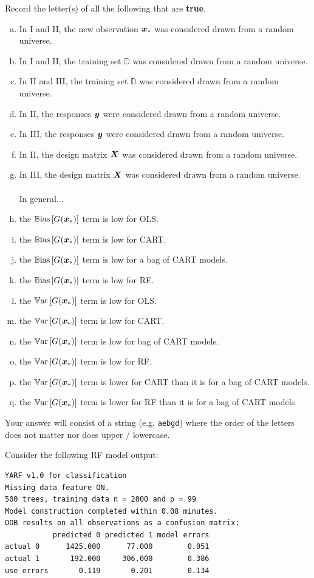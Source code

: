 \documentclass[12pt]{article}
\newcommand{\instr}{\small Your answer will consist of a string (e.g. \texttt{aebgd}) where the order of the letters does not matter nor does upper / lowercase. \normalsize}
\begin{document}
\benum
{} Record the letter(s) of all the following that are \textbf{true}. 

\begin{enumerate}[(a)]
\item In I and II, the new observation $\boldsymbol{x}_*$ was considered drawn from a random universe.
\item In I and II, the training set $\mathbb{D}$ was considered drawn from a random universe.
\item In II and III, the training set $\mathbb{D}$ was considered drawn from a random universe.
\item In II, the responses $\boldsymbol{y}$ were considered drawn from a random universe.
\item In III, the responses $\boldsymbol{y}$ were considered drawn from a random universe.
\item In II, the design matrix $\boldsymbol{X}$ was considered drawn from a random universe.
\item In III, the design matrix $\boldsymbol{X}$ was considered drawn from a random universe.\\~\\
In general...
\item the $\mathbb{B}\text{ias}\left[G(\boldsymbol{x}_*)\right]$ term is low for OLS.
\item the $\mathbb{B}\text{ias}\left[G(\boldsymbol{x}_*)\right]$ term is low for CART.
\item the $\mathbb{B}\text{ias}\left[G(\boldsymbol{x}_*)\right]$ term is low for a bag of CART models.
\item the $\mathbb{B}\text{ias}\left[G(\boldsymbol{x}_*)\right]$ term is low for RF.
\item the $\mathbb{V}\text{ar}\left[G(\boldsymbol{x}_*)\right]$ term is low for OLS.
\item the $\mathbb{V}\text{ar}\left[G(\boldsymbol{x}_*)\right]$ term is low for CART.
\item the $\mathbb{V}\text{ar}\left[G(\boldsymbol{x}_*)\right]$ term is low for bag of CART models.
\item the $\mathbb{V}\text{ar}\left[G(\boldsymbol{x}_*)\right]$ term is low for RF.
\item the $\mathbb{V}\text{ar}\left[G(\boldsymbol{x}_*)\right]$ term is lower for CART than it is for a bag of CART models.
\item the $\mathbb{V}\text{ar}\left[G(\boldsymbol{x}_*)\right]$ term is lower for RF than it is for a bag of CART models.
\end{enumerate}
\eenum\instr\pagebreak


\problem [11min] Consider the following RF model output:

\begin{lstlisting}
YARF v1.0 for classification
Missing data feature ON.
500 trees, training data n = 2000 and p = 99 
Model construction completed within 0.08 minutes.
OOB results on all observations as a confusion matrix:
           predicted 0 predicted 1 model errors
actual 0      1425.000      77.000        0.051
actual 1       192.000     306.000        0.386
use errors       0.119       0.201        0.134

\end{lstlisting}
\vspace{-1cm}
\benum
\end{document}
